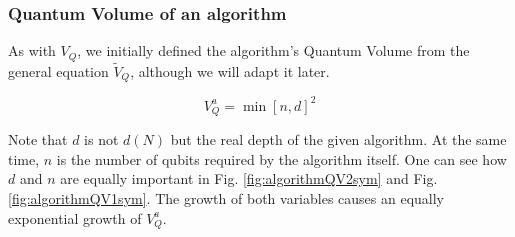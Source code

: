 \documentclass[11pt]{article}
\begin{document}
\subsubsection{Quantum Volume of an algorithm}
\label{sec:org108efe7}

As with \(V_Q\), we initially defined the algorithm's Quantum Volume from the general equation \(\tilde{V}_Q\), although we will adapt it later.

$$V_Q^a = \min \left[ n,d \right]^2$$

Note that \(d\) is not \(d(N)\) but the real depth of the given algorithm.
At the same time, \(n\) is the number of qubits required by the algorithm itself.
One can see how \(d\) and \(n\) are equally important in Fig. \ref{fig:algorithmQV2sym} and Fig. \ref{fig:algorithmQV1sym}.
The growth of both variables causes an equally exponential growth of \(V^a_Q\).

\end{document}
